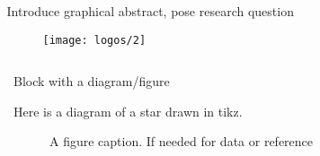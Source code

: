 \documentclass[final]{beamer}
\newlength{\sepwidthA} %
\newlength{\colwidthA} %
\newcommand{\separatorcolumnA}{\begin{column}{\sepwidthA}\end{column}}
\newlength{\sepwidthB}
\newlength{\colwidthB}
\newcommand{\separatorcolumnB}{\begin{column}{\sepwidthB}\end{column}}
\begin{document}
\begin{frame}[t]
\begin{columns}[t]
    \separatorcolumnA
    \begin{column}{\colwidthA}

        \begin{block}{Introduce graphical abstract, pose research question}
            \begin{figure}
                \centering
                \texttt{[image: logos/2]}
            \end{figure}
        \end{block}
    
    \end{column}

    \separatorcolumnA
\end{columns}

\begin{columns}
\separatorcolumnB

    \begin{column}[T]{\colwidthB}

        \begin{block}{Block with a diagram/figure}

        Here is a diagram of a star drawn in tikz.

        \begin{figure}
            \centering
            \caption{A figure caption. If needed for data or reference}
        \end{figure}
    \end{block}
    

\end{column}
\end{columns}
\end{frame}
\end{document}
